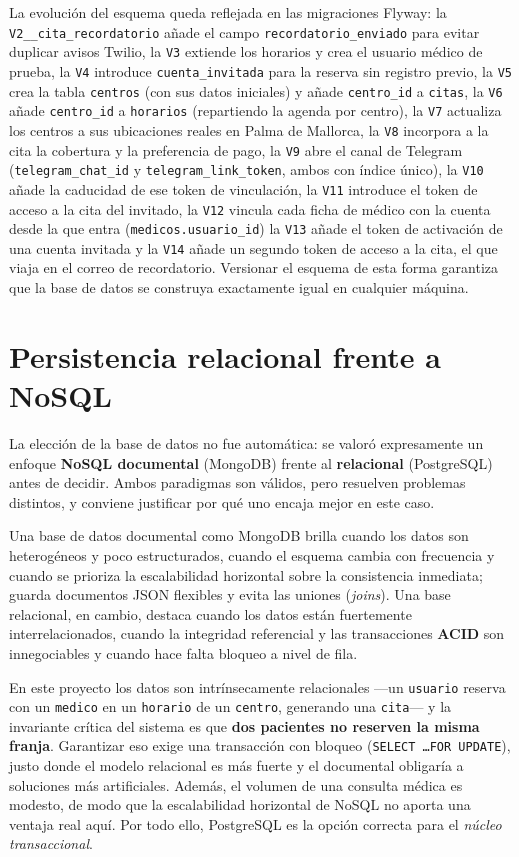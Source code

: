 \documentclass[12pt,a4paper]{report}
\begin{document}
La evolución del esquema queda reflejada en las migraciones Flyway: la \texttt{V2\_\_cita\_recordatorio} añade el campo \texttt{recordatorio\_enviado} para evitar duplicar avisos Twilio, la \texttt{V3} extiende los horarios y crea el usuario médico de prueba, la \texttt{V4} introduce \texttt{cuenta\_invitada} para la reserva sin registro previo, la \texttt{V5} crea la tabla \texttt{centros} (con sus datos iniciales) y añade \texttt{centro\_id} a \texttt{citas}, la \texttt{V6} añade \texttt{centro\_id} a \texttt{horarios} (repartiendo la agenda por centro), la \texttt{V7} actualiza los centros a sus ubicaciones reales en Palma de Mallorca, la \texttt{V8} incorpora a la cita la cobertura y la preferencia de pago, la \texttt{V9} abre el canal de Telegram (\texttt{telegram\_chat\_id} y \texttt{telegram\_link\_token}, ambos con índice único), la \texttt{V10} añade la caducidad de ese token de vinculación, la \texttt{V11} introduce el token de acceso a la cita del invitado, la \texttt{V12} vincula cada ficha de médico con la cuenta desde la que entra (\texttt{medicos.usuario\_id}) la \texttt{V13} añade el token de activación de una cuenta invitada y la \texttt{V14} añade un segundo token de acceso a la cita, el que viaja en el correo de recordatorio. Versionar el esquema de esta forma garantiza que la base de datos se construya exactamente igual en cualquier máquina.

\section{Persistencia relacional frente a NoSQL}

La elección de la base de datos no fue automática: se valoró expresamente un enfoque \textbf{NoSQL documental} (MongoDB) frente al \textbf{relacional} (PostgreSQL) antes de decidir. Ambos paradigmas son válidos, pero resuelven problemas distintos, y conviene justificar por qué uno encaja mejor en este caso.

Una base de datos documental como MongoDB brilla cuando los datos son heterogéneos y poco estructurados, cuando el esquema cambia con frecuencia y cuando se prioriza la escalabilidad horizontal sobre la consistencia inmediata; guarda documentos JSON flexibles y evita las uniones (\emph{joins}). Una base relacional, en cambio, destaca cuando los datos están fuertemente interrelacionados, cuando la integridad referencial y las transacciones \textbf{ACID} son innegociables y cuando hace falta bloqueo a nivel de fila.

En este proyecto los datos son intrínsecamente relacionales —un \texttt{usuario} reserva con un \texttt{medico} en un \texttt{horario} de un \texttt{centro}, generando una \texttt{cita}— y la invariante crítica del sistema es que \textbf{dos pacientes no reserven la misma franja}. Garantizar eso exige una transacción con bloqueo (\texttt{SELECT \ldots FOR UPDATE}), justo donde el modelo relacional es más fuerte y el documental obligaría a soluciones más artificiales. Además, el volumen de una consulta médica es modesto, de modo que la escalabilidad horizontal de NoSQL no aporta una ventaja real aquí. Por todo ello, PostgreSQL es la opción correcta para el \emph{núcleo transaccional}.
\end{document}
